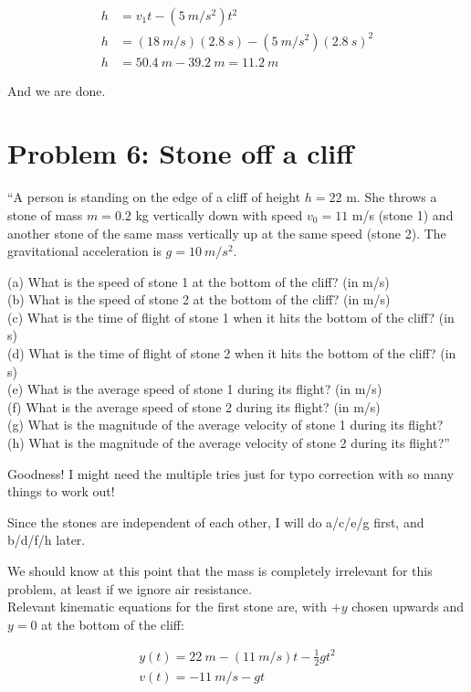 \documentclass[8.01x]{subfiles}
\begin{document}
\begin{align}
h &= v_1 t - (\SI{5}{m/s^2}) t^2\\
h &= (\SI{18}{m/s}) (\SI{2.8}{s}) - (\SI{5}{m/s^2}) (\SI{2.8}{s})^2\\
h &= \SI{50.4}{m} - \SI{39.2}{m} = \SI{11.2}{m}
\end{align}

And we are done.

\section{Problem 6: Stone off a cliff}

``A person is standing on the edge of a cliff of height $h = 22$ m. She throws a stone of mass $m = 0.2$ kg vertically down with speed $v_0 = 11$ m/s (stone 1) and another stone of the same mass vertically up at the same speed (stone 2). The gravitational acceleration is $g = \SI{10}{m/s^2}$.

(a) What is the speed of stone 1 at the bottom of the cliff? (in m/s)\\
(b) What is the speed of stone 2 at the bottom of the cliff? (in m/s)\\
(c) What is the time of flight of stone 1 when it hits the bottom of the cliff? (in s)\\
(d) What is the time of flight of stone 2 when it hits the bottom of the cliff? (in s)\\
(e) What is the average speed of stone 1 during its flight? (in m/s)\\
(f) What is the average speed of stone 2 during its flight? (in m/s)\\
(g) What is the magnitude of the average velocity of stone 1 during its flight?\\
(h) What is the magnitude of the average velocity of stone 2 during its flight?''

Goodness! I might need the multiple tries just for typo correction with so many things to work out!

Since the stones are independent of each other, I will do a/c/e/g first, and b/d/f/h later.

We should know at this point that the mass is completely irrelevant for this problem, at least if we ignore air resistance.\\
Relevant kinematic equations for the first stone are, with $+y$ chosen upwards and $y = 0$ at the bottom of the cliff:

\begin{align}
y(t) = \SI{22}{m} - (\SI{11}{m/s}) t - \frac{1}{2} g t^2\\
v(t) = - \SI{11}{m/s} - g t
\end{align}
\end{document}
